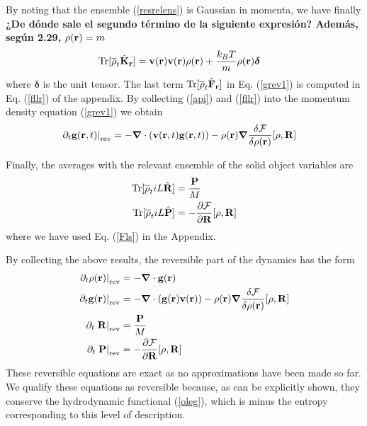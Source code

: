 \documentclass[b5paper,openright,11pt]{book}
\newcommand{\Note}[1]{{\bf \color{red}#1}}    %
\begin{document}
By noting that the ensemble (\ref{resrelens}) is Gaussian in momenta, we have finally \Note{¿De dónde sale el segundo término de la siguiente expresión? Además, según 2.29, $\rho({\bf r})=m$}
\begin{align}
  {\rm Tr}[\overline{\rho}_t \hat{{\bf K}}_{\bf r}] &=
{\bf v}({\bf r}){\bf v}({\bf r}){\rho}({\bf r})+\frac{k_BT}{m}\rho({\bf r})\boldsymbol{\delta}
\label{api}
\end{align}
where $\boldsymbol{\delta}$ is the unit  tensor.  The last term $ {\rm
  Tr}[\overline{\rho}_t \hat{\bf F}_{\bf r}]$  in Eq. (\ref{grev1}) is
computed  in   Eq.  (\ref{fllr})  of  the   appendix.   By  collecting
(\ref{api})  and  (\ref{fllr})  into  the  momentum  density  equation
(\ref{grev1}) we obtain
\begin{align}
\left.\partial_t {\bf g}({\bf r},t)\right|_{\rm rev} 
&=-\boldsymbol{\nabla}\cdot\left({\bf v}({\bf r},t)  {\bf g}({\bf r},t)  \right)
-\rho({\bf r})\boldsymbol{\nabla}
\frac{\delta {\cal F}}{\delta\rho({\bf r})}[\rho,{\bf R}]
\label{grev}
\end{align}

Finally, the averages with the relevant ensemble of the solid object variables are
\begin{align}
{\rm Tr}[\overline{\rho}_t  iL\hat{\bf R}] 
&=\frac{\bf P}{M}
\nonumber\\
{\rm Tr}[\overline{\rho}_t  iL\hat{\bf P}] 
&=-\frac{\partial {\cal F}}{\partial {\bf R}}[\rho,{\bf R}]
\end{align}
where we have used Eq. (\ref{Fls}) in the Appendix.

By collecting the  above results, the reversible part  of the dynamics
has the form
\begin{align}
\left.  \partial_t\rho({\bf r})\right|_{\rm rev}&=-\boldsymbol{\nabla}\cdot{\bf g}({\bf r})
\nonumber\\
\left.  \partial_t{\bf g}({\bf r})\right|_{\rm rev}&=-\boldsymbol{\nabla}\cdot\left({\bf g}({\bf r}){\bf v}({\bf r})\right)
-\rho({\bf r})\boldsymbol{\nabla} \frac{\delta {\cal F}}{\delta\rho({\bf r})}[\rho,{\bf R}]
\nonumber\\
\partial_t\left. {\bf R}\right|_{\rm rev}&=\frac{\bf P}{M}
\nonumber\\
\partial_t\left.{\bf P}\right|_{\rm rev}&=-\frac{\partial {\cal F}}{\partial {\bf R}}[\rho,{\bf R}]
\label{rev}
\end{align}
These reversible  equations are exact  as no approximations  have been
made so far. We qualify these  equations as reversible because, as can
be  explicitly  shown,  they   conserve  the  hydrodynamic  functional
(\ref{oleg}), which  is minus the entropy corresponding
  to this level of description.
\end{document}
